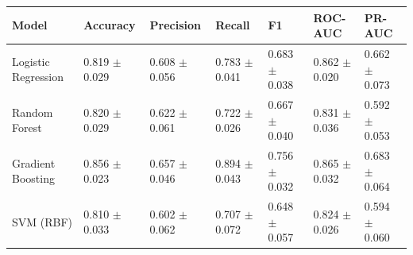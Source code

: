 \begin{tabular}{lllllll}
\toprule
Model & Accuracy & Precision & Recall & F1 & ROC-AUC & PR-AUC \\
\midrule
Logistic Regression & 0.819 $\pm$ 0.029 & 0.608 $\pm$ 0.056 & 0.783 $\pm$ 0.041 & 0.683 $\pm$ 0.038 & 0.862 $\pm$ 0.020 & 0.662 $\pm$ 0.073 \\
Random Forest & 0.820 $\pm$ 0.029 & 0.622 $\pm$ 0.061 & 0.722 $\pm$ 0.026 & 0.667 $\pm$ 0.040 & 0.831 $\pm$ 0.036 & 0.592 $\pm$ 0.053 \\
Gradient Boosting & 0.856 $\pm$ 0.023 & 0.657 $\pm$ 0.046 & 0.894 $\pm$ 0.043 & 0.756 $\pm$ 0.032 & 0.865 $\pm$ 0.032 & 0.683 $\pm$ 0.064 \\
SVM (RBF) & 0.810 $\pm$ 0.033 & 0.602 $\pm$ 0.062 & 0.707 $\pm$ 0.072 & 0.648 $\pm$ 0.057 & 0.824 $\pm$ 0.026 & 0.594 $\pm$ 0.060 \\
\bottomrule
\end{tabular}
